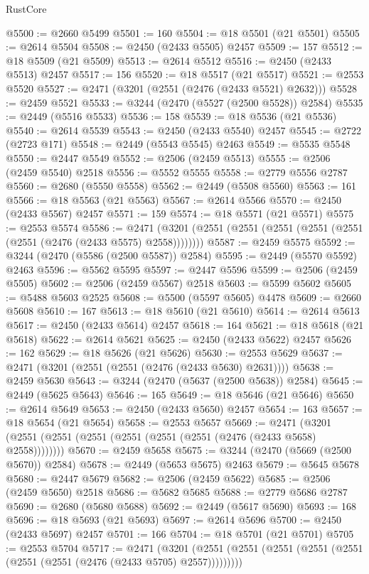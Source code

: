 \begin{lexlean}{RustCore}
\begin{coremodule}
@5500 := @2660 @5499
@5501 := 160
@5504 := @18 @5501 (@21 @5501)
@5505 := @2614 @5504
@5508 := @2450 (@2433 @5505) @2457
@5509 := 157
@5512 := @18 @5509 (@21 @5509)
@5513 := @2614 @5512
@5516 := @2450 (@2433 @5513) @2457
@5517 := 156
@5520 := @18 @5517 (@21 @5517)
@5521 := @2553 @5520
@5527 := @2471 (@3201 (@2551 (@2476 (@2433 @5521) @2632)))
@5528 := @2459 @5521
@5533 := @3244 (@2470 (@5527 (@2500 @5528)) @2584)
@5535 := @2449 (@5516 @5533)
@5536 := 158
@5539 := @18 @5536 (@21 @5536)
@5540 := @2614 @5539
@5543 := @2450 (@2433 @5540) @2457
@5545 := @2722 (@2723 @171)
@5548 := @2449 (@5543 @5545) @2463
@5549 := @5535 @5548
@5550 := @2447 @5549
@5552 := @2506 (@2459 @5513)
@5555 := @2506 (@2459 @5540) @2518
@5556 := @5552 @5555
@5558 := @2779 @5556 @2787
@5560 := @2680 (@5550 @5558)
@5562 := @2449 (@5508 @5560)
@5563 := 161
@5566 := @18 @5563 (@21 @5563)
@5567 := @2614 @5566
@5570 := @2450 (@2433 @5567) @2457
@5571 := 159
@5574 := @18 @5571 (@21 @5571)
@5575 := @2553 @5574
@5586 := @2471 (@3201 (@2551 (@2551 (@2551 (@2551 (@2551 (@2551 (@2476 (@2433 @5575) @2558))))))))
@5587 := @2459 @5575
@5592 := @3244 (@2470 (@5586 (@2500 @5587)) @2584)
@5595 := @2449 (@5570 @5592) @2463
@5596 := @5562 @5595
@5597 := @2447 @5596
@5599 := @2506 (@2459 @5505)
@5602 := @2506 (@2459 @5567) @2518
@5603 := @5599 @5602
@5605 := @5488 @5603 @2525
@5608 := @5500 (@5597 @5605) @4478
@5609 := @2660 @5608
@5610 := 167
@5613 := @18 @5610 (@21 @5610)
@5614 := @2614 @5613
@5617 := @2450 (@2433 @5614) @2457
@5618 := 164
@5621 := @18 @5618 (@21 @5618)
@5622 := @2614 @5621
@5625 := @2450 (@2433 @5622) @2457
@5626 := 162
@5629 := @18 @5626 (@21 @5626)
@5630 := @2553 @5629
@5637 := @2471 (@3201 (@2551 (@2551 (@2476 (@2433 @5630) @2631))))
@5638 := @2459 @5630
@5643 := @3244 (@2470 (@5637 (@2500 @5638)) @2584)
@5645 := @2449 (@5625 @5643)
@5646 := 165
@5649 := @18 @5646 (@21 @5646)
@5650 := @2614 @5649
@5653 := @2450 (@2433 @5650) @2457
@5654 := 163
@5657 := @18 @5654 (@21 @5654)
@5658 := @2553 @5657
@5669 := @2471 (@3201 (@2551 (@2551 (@2551 (@2551 (@2551 (@2551 (@2476 (@2433 @5658) @2558))))))))
@5670 := @2459 @5658
@5675 := @3244 (@2470 (@5669 (@2500 @5670)) @2584)
@5678 := @2449 (@5653 @5675) @2463
@5679 := @5645 @5678
@5680 := @2447 @5679
@5682 := @2506 (@2459 @5622)
@5685 := @2506 (@2459 @5650) @2518
@5686 := @5682 @5685
@5688 := @2779 @5686 @2787
@5690 := @2680 (@5680 @5688)
@5692 := @2449 (@5617 @5690)
@5693 := 168
@5696 := @18 @5693 (@21 @5693)
@5697 := @2614 @5696
@5700 := @2450 (@2433 @5697) @2457
@5701 := 166
@5704 := @18 @5701 (@21 @5701)
@5705 := @2553 @5704
@5717 := @2471
    (@3201 (@2551 (@2551 (@2551 (@2551 (@2551 (@2551 (@2551 (@2476 (@2433 @5705) @2557)))))))))

\end{coremodule}
\end{lexlean}
